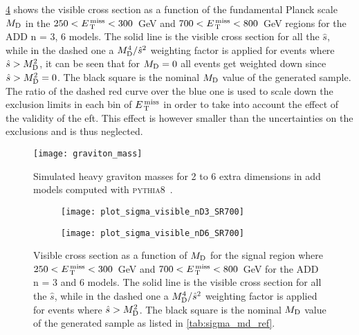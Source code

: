 \cref{fig:vis_sigma_trunc} shows the visible cross section as a function of the
fundamental Planck scale $M_\mathrm{D}$ in the $250 < E_\mathrm{\, T}^\mathrm{\, miss} < 300$~GeV and
$700 < E_\mathrm{\, T}^\mathrm{\, miss} < 800$~GeV regions for the ADD n = 3, 6 models. The solid line is
the visible cross section for all the $\hat{s}$, while in the dashed one a
$M_\mathrm{D}^4/\hat{s}^2$ weighting factor is applied for events where
$\hat{s} > M_\mathrm{D}^2$, it can be seen that for $M_\mathrm{D} = 0$ all events get weighted
down since $\hat{s} > M_\mathrm{D}^2 = 0$. The black square is the nominal $M_\mathrm{D}$ value of
the generated sample. The ratio of the dashed red curve over the blue one is
used to scale down the exclusion limits in each bin of $E_\mathrm{\, T}^\mathrm{\, miss}$ in order to take
into account the effect of the validity of the \gls{eft}. This effect is however
smaller than the uncertainties on the exclusions and is thus neglected.
\begin{figure}[!h]
  \centering
  \texttt{[image: graviton\_mass]}
  \caption{Simulated heavy graviton masses for 2 to 6 extra dimensions in
    \gls{add} models computed with \textsc{pythia8}~\cite{OllePhDThesis}.}
  \label{fig:graviton_mass}
\end{figure}
\begin{figure}[!h]
  \centering
  \begin{subfigure}{.48\linewidth}
    \texttt{[image: plot\_sigma\_visible\_nD3\_SR700]}
    \caption{}
    \label{fig:sigma_vis_n3}
  \end{subfigure}
  \begin{subfigure}{.48\linewidth}
    \texttt{[image: plot\_sigma\_visible\_nD6\_SR700]}
    \caption{}
    \label{fig:sigma_vis_n6}
  \end{subfigure}
  \caption{Visible cross section as a function of $M_\mathrm{D}$ for the signal region
    where $250 < E_\mathrm{\, T}^\mathrm{\, miss} < 300$~GeV and $700 < E_\mathrm{\, T}^\mathrm{\, miss} < 800$~GeV for the ADD n = 3
    and 6 models. The solid line is the visible cross section for all the
    $\hat{s}$, while in the dashed one a $M_\mathrm{D}^4/\hat{s}^2$ weighting factor is
    applied for events where $\hat{s} > M_\mathrm{D}^2$. The black square is the nominal
    $M_\mathrm{D}$ value of the generated sample as listed in \cref{tab:sigma_md_ref}.}
  \label{fig:vis_sigma_trunc}
\end{figure}
